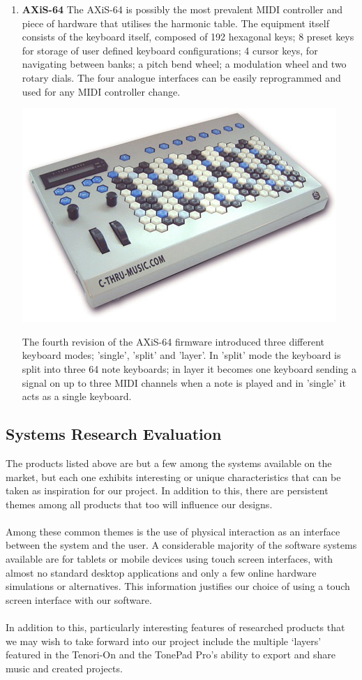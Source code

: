 \documentclass[10pt,a4paper]{article}
\begin{document}
\begin{enumerate}
\item \textbf{AXiS-64}
The AXiS-64 is possibly the most prevalent MIDI controller and piece of hardware that utilises the harmonic table. The equipment itself consists of the keyboard itself, composed of 192 hexagonal keys; 8 preset keys for storage of user defined keyboard configurations; 4 cursor keys, for navigating between banks; a pitch bend wheel; a modulation wheel and two rotary dials\cite{cthru}. The four analogue interfaces can be easily reprogrammed and used for any MIDI controller change.
\begin{center}
\includegraphics[scale=0.5]{4.jpg}
\end{center}
The fourth revision of the AXiS-64 firmware introduced three different keyboard modes; 'single', 'split' and 'layer'.  In 'split' mode the keyboard is split into three 64 note keyboards; in layer it becomes one keyboard sending a signal on up to three MIDI channels when a note is played and in 'single' it acts as a single keyboard.
\end{enumerate}
\subsection{Systems Research Evaluation}
The products listed above are but a few among the systems available on the market, but each one exhibits interesting or unique characteristics that can be taken as inspiration for our project. In addition to this, there are persistent themes among all products that too will influence our designs.\\
\\
Among these common themes is the use of physical interaction as an interface between the system and the user. A considerable majority of the software systems available are for tablets or mobile devices using touch screen interfaces, with almost no standard desktop applications and only a few online hardware simulations or alternatives. This information justifies our choice of using a touch screen interface with our software.\\
\\
In addition to this, particularly interesting features of researched products that we may wish to take forward into our project include the multiple `layers' featured in the Tenori-On and the TonePad Pro's ability to export and share music and created projects. 
\end{document}
